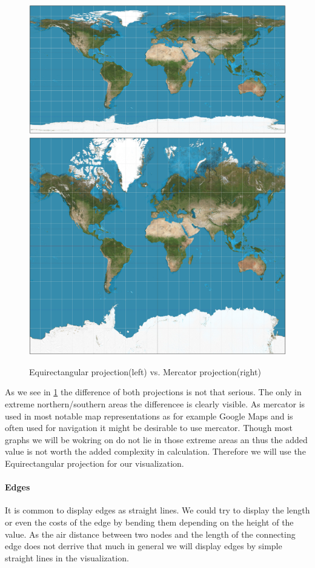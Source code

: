\documentclass
[
	paper = a4,
    pagesize,
	12 pt,
	oneside,                       %
    open = right,
	DIV = calc,
	BCOR = 0 mm,                   %
	bibtotoc
]
{scrbook}
\begin{document}

\begin{figure}[h!]
	\includegraphics[width=.5\textwidth]{Images/Equirectangular_projection_SW.jpg}
	\includegraphics[width=.5\textwidth]{Images/Mercator_projection_SW.jpg}
\caption[]{Equirectangular projection(left) vs. Mercator projection(right)}
\label{fig:projections}
\end{figure}


As we see in \ref{fig:projections} the difference of both projections is not that serious.
The only in extreme northern/southern areas the differencee is clearly visible.
As mercator is used in most notable map representations as for example Google Maps and is often used for navigation it might be desirable to use mercator.
Though most graphs we will be wokring on do not lie in those extreme areas an thus the added value is not worth the added complexity in calculation.
Therefore we will use the Equirectangular projection for our visualization.


\paragraph{Edges}

It is common to display edges as straight lines.
We could try to display the length or even the costs of the edge by bending them depending on the height of the value.
As the air distance between two nodes and the length of the connecting edge does not derrive that much in general we will display edges by simple straight lines in the visualization.
\end{document}
